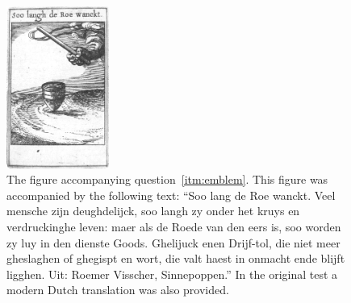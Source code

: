 \begin{figure}
    \centering
    \includegraphics[width=0.3\textwidth]{img/emblem.jpg}
    \caption{The figure accompanying question~\protect\ref{itm:emblem}. This figure was accompanied by the following text: ``Soo lang de Roe wanckt. Veel mensche zijn deughdelijck, soo langh zy onder het kruys en verdruckinghe leven: maer als de Roede van den eers is, soo worden zy luy in den dienste Goods. Ghelijuck enen Drijf-tol, die niet meer gheslaghen of ghegispt en wort, die valt haest in onmacht ende blijft ligghen. Uit: Roemer Visscher, Sinnepoppen.'' In the original test a modern Dutch translation was also provided.}
    \label{fig:emblem}
\end{figure}
